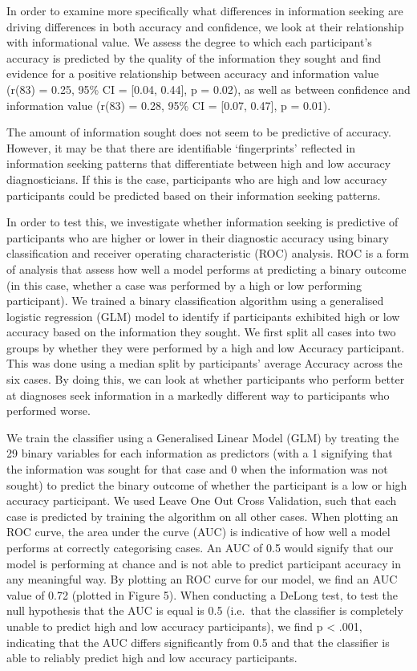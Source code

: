 \documentclass[a4paper, nobind]{templates/ociamthesis}
\begin{document}
In order to examine more specifically what differences in information seeking are driving differences in both accuracy and confidence, we look at their relationship with informational value. We assess the degree to which each participant's accuracy is predicted by the quality of the information they sought and find evidence for a positive relationship between accuracy and information value (r(83) = 0.25, 95\% CI = {[}0.04, 0.44{]}, p = 0.02), as well as between confidence and information value (r(83) = 0.28, 95\% CI = {[}0.07, 0.47{]}, p = 0.01).

The amount of information sought does not seem to be predictive of accuracy. However, it may be that there are identifiable `fingerprints' reflected in information seeking patterns that differentiate between high and low accuracy diagnosticians. If this is the case, participants who are high and low accuracy participants could be predicted based on their information seeking patterns.

In order to test this, we investigate whether information seeking is predictive of participants who are higher or lower in their diagnostic accuracy using binary classification and receiver operating characteristic (ROC) analysis. ROC is a form of analysis that assess how well a model performs at predicting a binary outcome (in this case, whether a case was performed by a high or low performing participant). We trained a binary classification algorithm using a generalised logistic regression (GLM) model to identify if participants exhibited high or low accuracy based on the information they sought. We first split all cases into two groups by whether they were performed by a high and low Accuracy participant. This was done using a median split by participants' average Accuracy across the six cases. By doing this, we can look at whether participants who perform better at diagnoses seek information in a markedly different way to participants who performed worse.

We train the classifier using a Generalised Linear Model (GLM) by treating the 29 binary variables for each information as predictors (with a 1 signifying that the information was sought for that case and 0 when the information was not sought) to predict the binary outcome of whether the participant is a low or high accuracy participant. We used Leave One Out Cross Validation, such that each case is predicted by training the algorithm on all other cases. When plotting an ROC curve, the area under the curve (AUC) is indicative of how well a model performs at correctly categorising cases. An AUC of 0.5 would signify that our model is performing at chance and is not able to predict participant accuracy in any meaningful way. By plotting an ROC curve for our model, we find an AUC value of 0.72 (plotted in Figure 5). When conducting a DeLong test, to test the null hypothesis that the AUC is equal is 0.5 (i.e.~that the classifier is completely unable to predict high and low accuracy participants), we find p \textless{} .001, indicating that the AUC differs significantly from 0.5 and that the classifier is able to reliably predict high and low accuracy participants.
\end{document}
